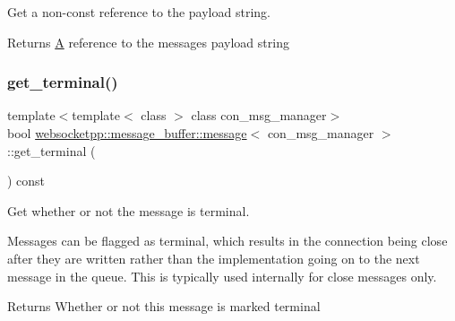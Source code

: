 Get a non-\/const reference to the payload string. 

\begin{DoxyReturn}{Returns}
\mbox{\hyperlink{struct_a}{A}} reference to the message\textquotesingle{}s payload string 
\end{DoxyReturn}
\mbox{\label{classwebsocketpp_1_1message__buffer_1_1message_a45e39497d283ec38d1360b60a5879e32}} 
\subsubsection{\texorpdfstring{get\+\_\+terminal()}{get\_terminal()}}
{\footnotesize\ttfamily template$<$template$<$ class $>$ class con\+\_\+msg\+\_\+manager$>$ \\
bool \mbox{\hyperlink{classwebsocketpp_1_1message__buffer_1_1message}{websocketpp\+::message\+\_\+buffer\+::message}}$<$ con\+\_\+msg\+\_\+manager $>$\+::get\+\_\+terminal (\begin{DoxyParamCaption}{ }\end{DoxyParamCaption}) const\hspace{0.3cm}{\ttfamily [inline]}}



Get whether or not the message is terminal. 

Messages can be flagged as terminal, which results in the connection being close after they are written rather than the implementation going on to the next message in the queue. This is typically used internally for close messages only.

\begin{DoxyReturn}{Returns}
Whether or not this message is marked terminal 
\end{DoxyReturn}
\mbox{\label{classwebsocketpp_1_1message__buffer_1_1message_a2c19e247389598d9f81c9447ddcfba51}} 
